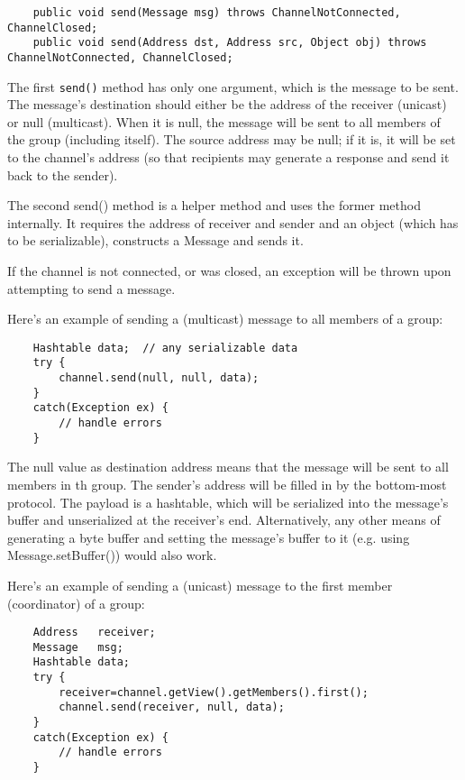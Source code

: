     \begin{small}
    \begin{verbatim}
    public void send(Message msg) throws ChannelNotConnected, ChannelClosed;
    public void send(Address dst, Address src, Object obj) throws ChannelNotConnected, ChannelClosed;
    \end{verbatim}
    \end{small}

    The first {\tt send()} method has only one argument, which is the message to be
    sent. The message's destination should either be the address of the receiver
    (unicast) or null (multicast). When it is null, the message will be sent to all
    members of the group (including itself). The source address may be null; if it
    is, it will be set to the channel's address (so that recipients may generate a
    response and send it back to the sender).

    The second send() method is a helper method and uses the former method
    internally. It requires the address of receiver and sender and an object (which
    has to be serializable), constructs a Message and sends it.

    If the channel is not connected, or was closed, an exception will be thrown upon
    attempting to send a message.


    Here's an example of sending a (multicast) message to all members of a group:
    
    \begin{small}
    \begin{verbatim}
    Hashtable data;  // any serializable data
    try {
        channel.send(null, null, data);
    }
    catch(Exception ex) {
        // handle errors
    }
    \end{verbatim}
    \end{small}

    The null value as destination address means that the message will be sent to all
    members in th group. The sender's address will be filled in by the bottom-most
    protocol. The payload is a hashtable, which will be serialized into the message's
    buffer and unserialized at the receiver's end. Alternatively, any other means of
    generating a byte buffer and setting the message's buffer to it (e.g. using
    Message.setBuffer()) would also work.


    Here's an example of sending a (unicast) message to the first member
    (coordinator) of a group:

    \begin{small}
    \begin{verbatim}
    Address   receiver;
    Message   msg;
    Hashtable data;
    try {
        receiver=channel.getView().getMembers().first();
        channel.send(receiver, null, data);
    }
    catch(Exception ex) {
        // handle errors
    }
    \end{verbatim}
    \end{small}

